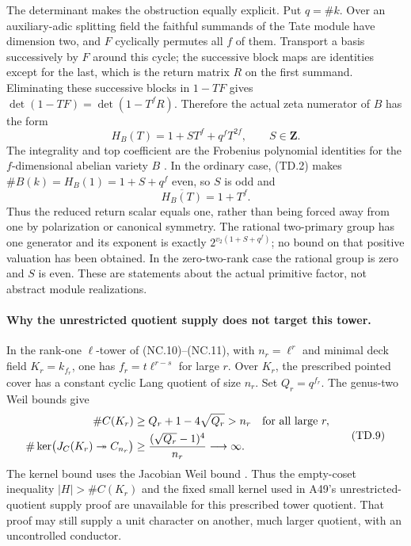 \documentclass[11pt,a4paper]{article}
\begin{document}
The determinant makes the obstruction equally explicit.
Put $q=\#k$. Over an auxiliary-adic splitting field the
faithful summands of the Tate module have dimension two,
and $F$ cyclically permutes all $f$ of them.
Transport a basis successively by $F$ around this cycle;
the successive block maps are identities except for the last,
which is the return matrix $R$ on the first summand.
Eliminating these successive blocks in $1-TF$ gives
$\det(1-TF)=\det(1-T^fR)$. Therefore the
actual zeta numerator of $B$ has the form
\[
                       H_B(T)=1+S T^f+q^fT^{2f},\qquad S\in\mathbf Z.
 \tag{TD.7}
\]
The integrality and top coefficient are the Frobenius
polynomial identities for the $f$-dimensional abelian variety
$B$ \cite[Theorem~19.1]{MilneAV}.
In the ordinary case, (TD.2) makes
$\#B(k)=H_B(1)=1+S+q^f$ even, so $S$ is odd and
\[
                        \overline{H_B(T)}=1+T^f.
 \tag{TD.8}
\]
Thus the reduced return scalar equals one, rather than being
forced away from one by polarization or canonical symmetry.
The rational two-primary group has one generator and its
exponent is exactly
$2^{v_2(1+S+q^f)}$; no bound on that positive valuation has
been obtained. In the zero-two-rank case the rational group
is zero and $S$ is even. These are statements about the
actual primitive factor, not abstract module realizations.

\paragraph{Why the unrestricted quotient supply does not target this tower.}
In the rank-one $\ell$-tower of (NC.10)--(NC.11), with
$n_r=\ell^r$ and minimal deck field $K_r=k_{f_r}$,
one has $f_r=t\ell^{r-s}$ for large $r$.
Over $K_r$, the prescribed pointed cover has a constant
cyclic Lang quotient of size $n_r$.
Set $Q_r=q^{f_r}$. The genus-two Weil bounds give
\cite[Theorem~11.1]{MilneJV}
\[
\begin{aligned}
 \#C(K_r)&\ge Q_r+1-4\sqrt{Q_r}>n_r
                                      &&\hbox{for all large }r,\\
 \#\ker\bigl(J_C(K_r)\twoheadrightarrow C_{n_r}\bigr)
   &\ge\frac{(\sqrt{Q_r}-1)^4}{n_r}\longrightarrow\infty.
\end{aligned}
 \tag{TD.9}
\]
The kernel bound uses the Jacobian Weil bound
\cite[Theorem~19.1]{MilneAV}.
Thus the empty-coset inequality $|H|>\#C(K_r)$ and the fixed
small kernel used in A49's unrestricted-quotient supply proof
are unavailable for this prescribed tower quotient.
That proof may still supply a unit character on another,
much larger quotient, with an uncontrolled conductor.
\end{document}
